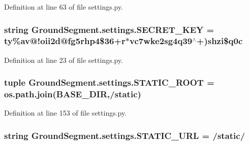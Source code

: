 Definition at line 63 of file settings.\+py.

\hypertarget{namespace_ground_segment_1_1settings_a962d63c2c779045196141e0ac3e0415a}{}
\subsubsection[{S\+E\+C\+R\+E\+T\+\_\+\+K\+E\+Y}]{\setlength{\rightskip}{0pt plus 5cm}string Ground\+Segment.\+settings.\+S\+E\+C\+R\+E\+T\+\_\+\+K\+E\+Y = \textquotesingle{}ty\%av@!oii2d@fg5rhp4\$36+r$\ast$vc7wke2sg4q39$^\wedge$+)shzi\$q0c\textquotesingle{}}\label{namespace_ground_segment_1_1settings_a962d63c2c779045196141e0ac3e0415a}


Definition at line 23 of file settings.\+py.

\hypertarget{namespace_ground_segment_1_1settings_a99341177ff9700bce98aaa850c09412d}{}
\subsubsection[{S\+T\+A\+T\+I\+C\+\_\+\+R\+O\+O\+T}]{\setlength{\rightskip}{0pt plus 5cm}tuple Ground\+Segment.\+settings.\+S\+T\+A\+T\+I\+C\+\_\+\+R\+O\+O\+T = os.\+path.\+join({\bf B\+A\+S\+E\+\_\+\+D\+I\+R},\textquotesingle{}/static\textquotesingle{})}\label{namespace_ground_segment_1_1settings_a99341177ff9700bce98aaa850c09412d}


Definition at line 153 of file settings.\+py.

\hypertarget{namespace_ground_segment_1_1settings_ae91e0e33f45cae10b6f1f4aef7862e1a}{}
\subsubsection[{S\+T\+A\+T\+I\+C\+\_\+\+U\+R\+L}]{\setlength{\rightskip}{0pt plus 5cm}string Ground\+Segment.\+settings.\+S\+T\+A\+T\+I\+C\+\_\+\+U\+R\+L = \textquotesingle{}/static/\textquotesingle{}}\label{namespace_ground_segment_1_1settings_ae91e0e33f45cae10b6f1f4aef7862e1a}


